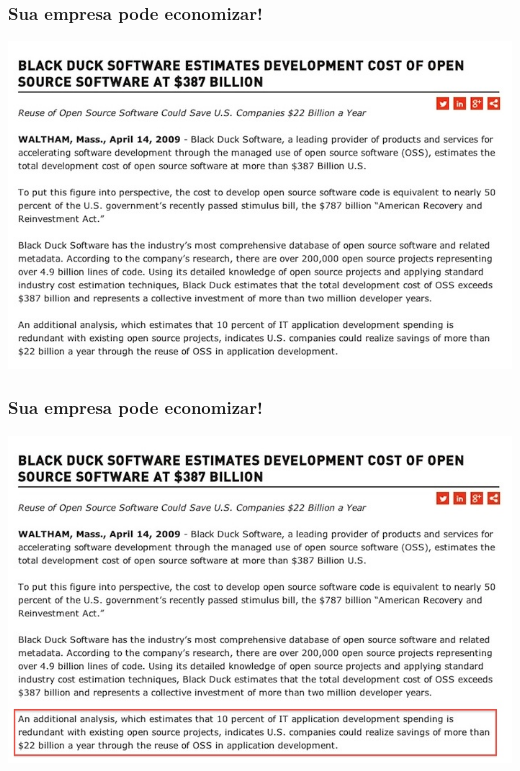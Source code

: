 \documentclass[xcolor=dvipsnames]{beamer}
\begin{document}
\begin{frame}
	\frametitle{Sua empresa pode economizar!}
 	\includegraphics[scale=0.45]{economia.jpg}	
\end{frame}

\begin{frame}
	\frametitle{Sua empresa pode economizar!}
 	\includegraphics[scale=0.45]{economia2.jpg}	
\end{frame}
\end{document}
